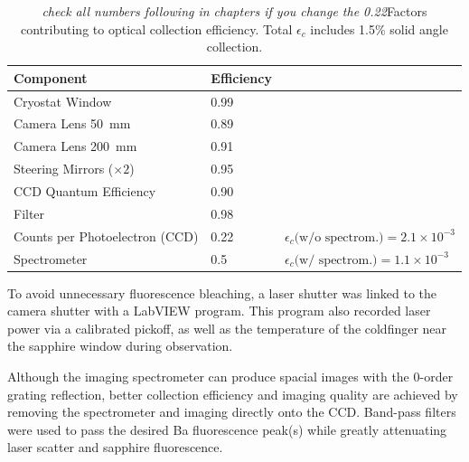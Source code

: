 \begin{table} [!htbp]
\caption{\emph{\color{gray}check all numbers following in chapters if you change the 0.22}Factors contributing to optical collection efficiency.  Total $\epsilon_{c}$ includes 1.5\% solid angle collection.}
\label{table:colleff}
\begin{tabular}{l l l}
Component & Efficiency & \\
\hline
Cryostat Window & 0.99 & \\
Camera Lens 50~mm & 0.89 & \\
Camera Lens 200~mm & 0.91 & \\
Steering Mirrors ($\times 2$) & 0.95 & \\
CCD Quantum Efficiency & 0.90 & \\
Filter & 0.98 & \\
Counts per Photoelectron (CCD) & 0.22 & $\epsilon_{c}\text{(w/o spectrom.)} = 2.1 \times 10^{-3}$\\
\hline
Spectrometer & 0.5 & $\epsilon_{c}\text{(w/ spectrom.)} = 1.1 \times 10^{-3}$\\
\end{tabular}
\end{table}


To avoid unnecessary fluorescence bleaching, a laser shutter was linked to the camera shutter with a LabVIEW program.  This program also recorded laser power via a calibrated pickoff, as well as the temperature of the coldfinger near the sapphire window during observation.


Although the imaging spectrometer can produce spacial images with the 0-order grating reflection, better collection efficiency and imaging quality are achieved by removing the spectrometer and imaging directly onto the CCD.  Band-pass filters were used to pass the desired Ba fluorescence peak(s) while greatly attenuating laser scatter and sapphire fluorescence.

